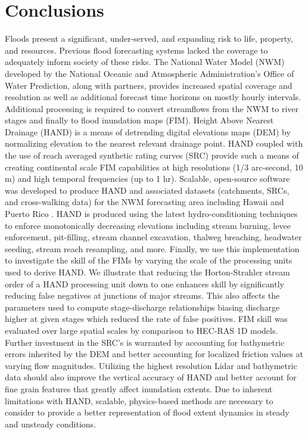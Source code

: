 \documentclass[draft]{dependencies/agujournal2019}
\begin{document}
\section{Conclusions}
\label{sec:conclusions}
%
Floods present a significant, under-served, and expanding risk to life, property, and resources.
Previous flood forecasting systems lacked the coverage to adequately inform society of these risks.
The National Water Model (NWM) developed by the National Oceanic and Atmospheric Administration's Office of Water Prediction, along with partners, provides increased spatial coverage and resolution as well as additional forecast time horizons on mostly hourly intervals.
Additional processing is required to convert streamflows from the NWM to river stages and finally to flood inundation maps (FIM).
Height Above Nearest Drainage (HAND) is a means of detrending digital elevations maps (DEM) by normalizing elevation to the nearest relevant drainage point.
HAND coupled with the use of reach averaged synthetic rating curves (SRC) provide such a means of creating continental scale FIM capabilities at high resolutions (1/3 arc-second, 10 m) and high temporal frequencies (up to 1 hr).
Scalable, open-source software was developed to produce HAND and associated datasets (catchments, SRCs, and cross-walking data) for the NWM forecasting area including Hawaii and Puerto Rico \cite{inundationMapping2022}.
HAND is produced using the latest hydro-conditioning techniques to enforce monotonically decreasing elevations including stream burning, levee enforcement, pit-filling, stream channel excavation, thalweg breaching, headwater seeding, stream reach resampling, and more. 
Finally, we use this implementation to investigate the skill of the FIMs by varying the scale of the processing units used to derive HAND.
We illustrate that reducing the Horton-Strahler stream order of a HAND processing unit down to one enhances skill by significantly reducing false negatives at junctions of major streams.
This also affects the parameters used to compute stage-discharge relationships biasing discharge higher at given stages which reduced the rate of false positives.
FIM skill was evaluated over large spatial scales by comparison to HEC-RAS 1D models.
Further investment in the SRC's is warranted by accounting for bathymetric errors inherited by the DEM and better accounting for localized friction values at varying flow magnitudes.
Utilizing the highest resolution Lidar and bathymetric data should also improve the vertical accuracy of HAND and better account for fine grain features that greatly affect inundation extents.
Due to inherent limitations with HAND, scalable, physics-based methods are necessary to consider to provide a better representation of flood extent dynamics in steady and unsteady conditions. 
%
\end{document}
